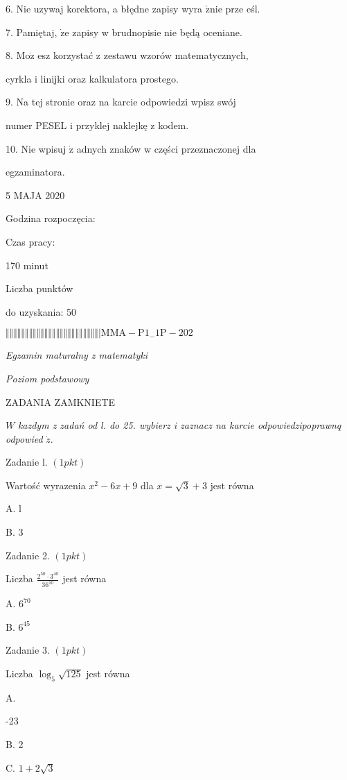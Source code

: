 \documentclass[a4paper,12pt]{article}
\begin{document}
6. Nie uzywaj korektora, a błędne zapisy wyra $\acute{\mathrm{z}}\mathrm{n}\mathrm{i}\mathrm{e}$ prze eśl.

7. Pamiętaj, $\dot{\mathrm{z}}\mathrm{e}$ zapisy w brudnopisie nie będą oceniane.

8. $\mathrm{M}\mathrm{o}\dot{\mathrm{z}}$ esz korzystać z zestawu wzorów matematycznych,

cyrkla i linijki oraz kalkulatora prostego.

9. Na tej stronie oraz na karcie odpowiedzi wpisz swój

numer PESEL i przyklej naklejkę z kodem.

10. Nie wpisuj $\dot{\mathrm{z}}$ adnych znaków w części przeznaczonej dla

egzaminatora.

5 MAJA 2020

Godzina rozpoczęcia:

Czas pracy:

170 minut

Liczba punktów

do uzyskania: 50

$\Vert\Vert\Vert\Vert\Vert\Vert\Vert\Vert\Vert\Vert\Vert\Vert\Vert\Vert\Vert\Vert\Vert\Vert\Vert\Vert\Vert\Vert\Vert\Vert|  \mathrm{M}\mathrm{M}\mathrm{A}-\mathrm{P}1_{-}1\mathrm{P}-202$




{\it Egzamin maturalny z matematyki}

{\it Poziom podstawowy}

ZADANIA ZAMKNIETE

$W$ {\it kazdym z zadań od l. do 25. wybierz i zaznacz na karcie odpowiedzipoprawnq odpowied} $\acute{z}.$

Zadanie l. $(1pkt)$

Wartość wyrazenia $x^{2}-6x+9$ dla $x=\sqrt{3}+3$ jest równa

A. l

B. 3

Zadanie 2. $(1pkt)$

Liczba $\displaystyle \frac{2^{50}\cdot 3^{40}}{36^{10}}$ jest równa

A. $6^{70}$

B. $6^{45}$

Zadanie 3. $(1pkt)$

Liczba $\log_{5}\sqrt{125}$ jest równa

A.

-23

B. 2

C. $1+2\sqrt{3}$
\end{document}
